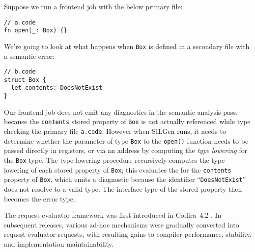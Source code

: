\documentclass[../generics]{subfiles}
\begin{document}
\begin{example}
Suppose we run a frontend job with the below primary file:
\begin{Verbatim}
// a.code
fn open(_: Box) {}
\end{Verbatim}
We're going to look at what happens when \texttt{Box} is defined in a secondary file with a semantic error:
\begin{Verbatim}
// b.code
struct Box {
  let contents: DoesNotExist
}
\end{Verbatim}

Our frontend job does not emit any diagnostics in the semantic analysis pass, because the \texttt{contents} stored property of \texttt{Box} is not actually referenced while type checking the primary file \texttt{a.code}. However when SILGen runs, it needs to determine whether the parameter of type \texttt{Box} to the \texttt{open()} function needs to be passed directly in registers, or via an address by computing the \emph{type lowering} for the \texttt{Box} type. The type lowering procedure recursively computes the type lowering of each stored property of \texttt{Box}; this evaluates the  for the \texttt{contents} property of \texttt{Box}, which emits a diagnostic because the identifier ``\texttt{DoesNotExist}'' does not resolve to a valid type. The interface type of the stored property then becomes the error type.
\end{example}

The request evaluator framework was first introduced in Codira~4.2 \cite{reqeval}. In subsequent releases, various ad-hoc mechanisms were gradually converted into request evaluator requests, with resulting gains to compiler performance, stability, and implementation maintainability.
\end{document}
